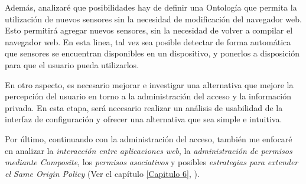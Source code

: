 Además, analizaré que posibilidades hay de definir una Ontología que permita la utilización de nuevos sensores sin la necesidad de modificación del navegador web. Esto permitirá agregar nuevos sensores, sin la necesidad de volver a compilar el navegador web. En esta linea, tal vez sea posible detectar de forma automática que sensores se encuentran disponibles en un dispositivo, y ponerlos a disposición para que el usuario pueda utilizarlos.

En otro aspecto, es necesario mejorar e investigar una alternativa que mejore la percepción del usuario en torno a la administración del acceso y la información privada. En esta etapa, será necesario realizar un análisis de usabilidad de la interfaz de configuración y ofrecer una alternativa que sea simple e intuitiva.

Por último, continuando con la administración del acceso, también me enfocaré en analizar la \emph{interacción entre aplicaciones web}, la \emph{administración de permisos mediante Composite}, los \emph{permisos asociativos} y 	posibles \emph{estrategias para extender el Same Origin Policy} (Ver el capítulo \ref{Capitulo 6}, ).